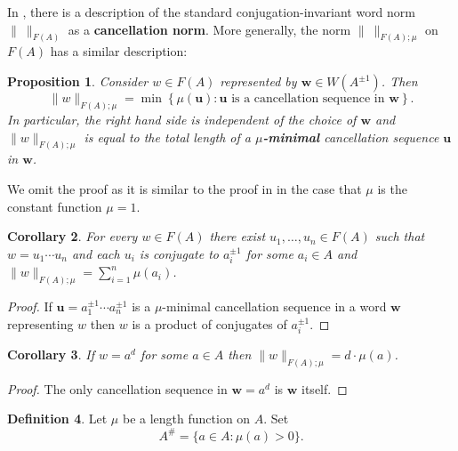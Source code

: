 \documentclass[12pt]{amsart}
\newtheorem{prop}{Proposition}[section]
\newtheorem{cor}[prop]{Corollary}
\theoremstyle{definition}
\newtheorem{defn}[prop]{Definition}
\newcommand{\B}[1]{\mathbf{#1}}
\def\Free{F}
\begin{document}
In \cite{MR3426433}, there is a description of the standard conjugation-invariant word norm $\| \ \|_{\Free(A)}$ as a {\bf cancellation norm}.
More generally, the norm $\| \ \|_{\Free(A);\mu}$ on $\Free(A)$ has a similar description:


\begin{prop}\label{P:cancellation norm on FA}
Consider $w \in \Free(A)$ represented by  $\B w \in W(A^{\pm 1})$.
Then
\[
\| w\|_{\Free(A);\mu} = \min \left\{ \mu(\B u) : \text{$\B u$ is a cancellation sequence in $\B w$}\right\}.
\]
In particular, the right hand side is independent of the choice of $\B w$ and $\|w\|_{\Free(A);\mu}$ is equal to the total length of a {\bf $\mu$-minimal} cancellation sequence $\B u$ in $\B w$.
\end{prop}

We omit the proof as it is similar to the proof in \cite[Proposition 2.E] {MR3426433} in the case that $\mu$ is the constant function $\mu=1$.


\begin{cor}\label{C:minimal product of conjugates in FAmu}
For every $w \in \Free(A)$ there exist $u_1,\dots,u_n \in \Free(A)$ such that $w=u_1\cdots u_n$ and each $u_i$ is conjugate to $a_i^{\pm 1}$ for some  $a_i \in A$ and $\| w\|_{\Free(A);\mu} = \sum_{i=1}^n \mu(a_i)$.
\end{cor}

\begin{proof}
If $\B u=a_1^{\pm 1} \cdots a_n^{\pm 1}$ is a $\mu$-minimal cancellation sequence in a word $\B w$ representing $w$ then $w$ is a product of conjugates of $a_i^{\pm 1}$.
\end{proof}



\begin{cor}\label{C:norm of syllable in FA}
If $w=a^d$ for some $a \in A$ then $\|w\|_{\Free(A);\mu} = d \cdot \mu(a)$.
\end{cor}

\begin{proof}
The only cancellation sequence in $\B w=a^d$ is $\B w$ itself.
\end{proof}





\begin{defn}\label{D:sharp flat on W(A)}
Let $\mu$ be a length function on $A$.
Set
\[
A^\# = \{ a \in A : \mu(a)>0\}.
\]
\end{defn}
\end{document}
